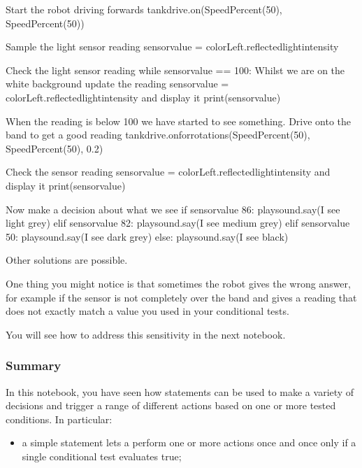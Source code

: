 \documentclass[letterpaper,10pt,english]{sphinxmanual}
\begin{document}
{{\begin{sphinxVerbatim}[commandchars=\\\{\}]
\PYGZsh{} Start the robot driving forwards
tank\PYGZus{}drive.on(SpeedPercent(50), SpeedPercent(50))

\PYGZsh{}Sample the light sensor reading
sensor\PYGZus{}value = colorLeft.reflected\PYGZus{}light\PYGZus{}intensity

\PYGZsh{}Check the light sensor reading
while sensor\PYGZus{}value == 100:
    \PYGZsh{} Whilst we are on the white background
    \PYGZsh{} update the reading
    sensor\PYGZus{}value = colorLeft.reflected\PYGZus{}light\PYGZus{}intensity
    \PYGZsh{} and display it
    print(sensor\PYGZus{}value)

\PYGZsh{} When the reading is below 100
\PYGZsh{} we have started to see something.
\PYGZsh{} Drive onto the band to get a good reading
tank\PYGZus{}drive.on\PYGZus{}for\PYGZus{}rotations(SpeedPercent(50), SpeedPercent(50), 0.2)

\PYGZsh{}Check the sensor reading
sensor\PYGZus{}value = colorLeft.reflected\PYGZus{}light\PYGZus{}intensity
\PYGZsh{} and display it
print(sensor\PYGZus{}value)

\PYGZsh{} Now make a decision about what we see
if sensor\PYGZus{}value \PYGZgt{}  86:
    playsound.say(\PYGZdq{}I see light grey\PYGZdq{})
elif sensor\PYGZus{}value \PYGZgt{} 82:
    playsound.say(\PYGZdq{}I see medium grey\PYGZdq{})
elif sensor\PYGZus{}value \PYGZgt{} 50:
    playsound.say(\PYGZdq{}I see dark grey\PYGZdq{})
else:
    playsound.say(\PYGZdq{}I see black\PYGZdq{})
\end{sphinxVerbatim}
}

Other solutions are possible.

One thing you might notice is that sometimes the robot gives the wrong answer, for example if the sensor is not completely over the band and gives a reading that does not exactly match a value you used in your conditional tests.

You will see how to address this sensitivity in the next notebook.


\subsubsection{Summary}
\label{\detokenize{content/02_Robot_Lab/Section_00_02:Summary}}
In this notebook, you have seen how  statements can be used to make a variety of decisions and trigger a range of different actions based on one or more tested conditions. In particular:
\begin{itemize}
\item {} 
a simple  statement lets a perform one or more actions once and once only if a single conditional test evaluates true;


\end{itemize}}
\end{document}
